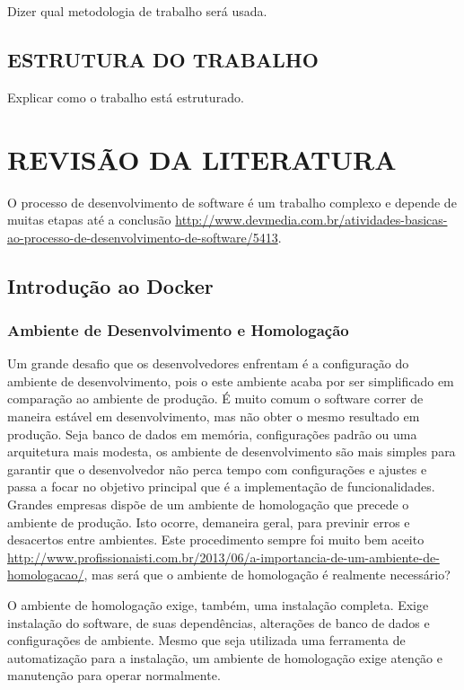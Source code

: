 \documentclass[
	12pt,				%
	openright,			%
	oneside,			%
	a4paper,			%
	chapter=TITLE,		%
	section=TITLE,		%
	english,			%
	french,				%
	spanish,			%
	brazil				%
	]{abntex2}
\begin{document}
Dizer qual metodologia de trabalho será usada.

\section{ESTRUTURA DO TRABALHO}

Explicar como o trabalho está estruturado.

\chapter{REVISÃO DA LITERATURA}\label{cap-revisao}

O processo de desenvolvimento de software é um trabalho complexo e depende de muitas etapas até a conclusão \url{http://www.devmedia.com.br/atividades-basicas-ao-processo-de-desenvolvimento-de-software/5413}.

\section{Introdução ao Docker}

\subsection{Ambiente de Desenvolvimento e Homologação}

Um grande desafio que os desenvolvedores enfrentam é a configuração do ambiente de desenvolvimento, pois o este ambiente acaba por ser simplificado em comparação ao ambiente de produção. É muito comum o software correr de maneira estável em desenvolvimento, mas não obter o mesmo resultado em produção. Seja banco de dados em memória, configurações padrão ou uma arquitetura mais modesta, os ambiente de desenvolvimento são mais simples para garantir que o desenvolvedor não perca tempo com configurações e ajustes e passa a focar no objetivo principal que é a implementação de funcionalidades.
Grandes empresas dispõe de um ambiente de homologação que precede o ambiente de produção. Isto ocorre, demaneira geral, para previnir erros e desacertos entre ambientes. Este procedimento sempre foi muito bem aceito \url{http://www.profissionaisti.com.br/2013/06/a-importancia-de-um-ambiente-de-homologacao/}, mas será que o ambiente de homologação é realmente necessário?

O ambiente de homologação exige, também, uma instalação completa. Exige instalação do software, de suas dependências, alterações de banco de dados e configurações de ambiente. Mesmo que seja utilizada uma ferramenta de automatização para a instalação, um ambiente de homologação exige atenção e manutenção para operar normalmente.
\end{document}
